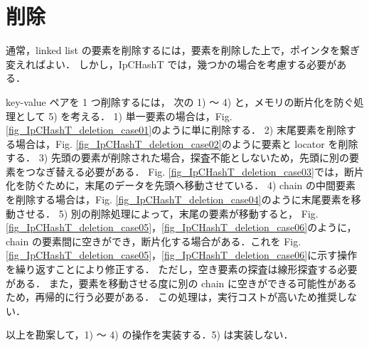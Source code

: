 
\section{削除}

通常，linked list の要素を削除するには，要素を削除した上で，ポインタを繋ぎ変えればよい．
しかし，IpCHashT では，幾つかの場合を考慮する必要がある．

key-value ペアを 1 つ削除するには，
次の 1) 〜 4) と，メモリの断片化を防ぐ処理として 5) を考える．
1) 単一要素の場合は，Fig. \ref{fig_IpCHashT_deletion_case01}のように単に削除する．
2) 末尾要素を削除する場合は，Fig. \ref{fig_IpCHashT_deletion_case02}のように要素と locator を削除する．
3) 先頭の要素が削除された場合，探査不能としないため，先頭に別の要素をつなぎ替える必要がある．
Fig. \ref{fig_IpCHashT_deletion_case03}では，断片化を防ぐために，末尾のデータを先頭へ移動させている．
4) chain の中間要素を削除する場合は，Fig. \ref{fig_IpCHashT_deletion_case04}のように末尾要素を移動させる．
5) 別の削除処理によって，末尾の要素が移動すると，
Fig. \ref{fig_IpCHashT_deletion_case05}，\ref{fig_IpCHashT_deletion_case06}のように，
chain の要素間に空きができ，断片化する場合がある．これを
Fig. \ref{fig_IpCHashT_deletion_case05}，\ref{fig_IpCHashT_deletion_case06}に示す操作を繰り返すことにより修正する．
ただし，空き要素の探査は線形探査する必要がある．
また，要素を移動させる度に別の chain に空きができる可能性があるため，再帰的に行う必要がある．
この処理は，実行コストが高いため推奨しない．

以上を勘案して，1) 〜 4) の操作を実装する．5) は実装しない．

